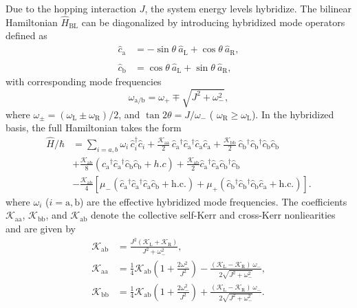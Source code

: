 \documentclass[%
reprint,
floatfix,
superscriptaddress,
amsmath,amssymb,
aps,
pra,
]{revtex4-2}
\newcommand*{\scrpt}[1]{\mathrm{#1}}
\newcommand*{\s}[1]{\ensuremath{_\scrpt{#1}}}
\begin{document}
Due to the hopping interaction $J$, the system energy levels hybridize. The bilinear Hamiltonian $\hat H_{\mathrm{BL}}$ can be diagonalized by introducing hybridized mode operators defined as
%
 \begin{align}  
     \label{AB}
     \hat c\s{a} & = - \sin \theta \: \hat a\s{L} + \cos \theta \: \hat a\s{R},\nonumber 
    \\
    \\
    \hat c\s{b} & = \cos \theta \: \hat a\s{L} + \sin \theta \: \hat a\s{R}, \nonumber  
\end{align}
%
with corresponding mode frequencies
%
\begin{equation}
    \label{eq_hybridized_frquencies}
    \omega\s{a/b}  = \omega_{+} \mp \sqrt{J^2 + \omega_-^2}, 
\end{equation}
%
\noindent
where $\omega_{\pm} = (\omega\mathrm{_L} \pm \omega\mathrm{_R}) /2$, and $\tan 2 \theta = J / \omega_-$ ( $\omega\mathrm{_R} \geq \omega\mathrm{_L} $). 
In the hybridized basis, the full Hamiltonian takes the form
%
\begin{align}
\label{HHyb}
    \hat H / \hbar  & = \sum_{i=a,b} \omega_i \, \hat c_i^{\dagger} \hat c_i +\frac{\mathcal{K}\s{aa}}{2} \, \hat c\s{a}^{\dagger} \hat c\s{a}^{\dagger} \hat c\s{a}  \hat c\s{a}  + \frac{\mathcal{K}\s{bb}}{2} \, \hat c\s{b}^{\dagger} \hat c\s{b}^{\dagger} \hat c\s{b} \hat c\s{b} \nonumber \\
    & + \frac{\mathcal{K}\s{ab}}{8} \left( \hat c\s{a}^{\dagger} \hat c\s{a}^{\dagger} \hat c\s{b} \hat c\s{b} + h.c \right) + \frac{\mathcal{K}\s{ab}}{2} \hat c\s{a}^{\dagger} \hat c\s{a} \hat c\s{b}^{\dagger} \hat c\s{b}   \\
   & - \frac{\mathcal{K}\s{ab}}{4} \left[ \mu_- \left( \hat c\s{a}^{\dagger} \hat c\s{a}^{\dagger} \hat c\s{a} \hat c\s{b} + \mathrm{h.c.} \right) + \mu_+ \left( \hat c\s{b}^{\dagger} \hat c\s{b}^{\dagger} \hat c\s{b}  \hat c\s{a}  + \mathrm{h.c.} \right) \right]. \nonumber
\end{align}
%
where $\omega_{i}$ ($i = \mathrm{a, b}$) are the effective hybridized mode frequencies. The coefficients $\mathcal{K}\s{aa}$, $\mathcal{K}\s{bb}$, and $\mathcal{K}\s{ab}$ denote the collective self-Kerr and cross-Kerr nonliearities and are given by
%
\begin{subequations}
\begin{align}
\label{Kerr}
    \mathcal{K}\s{ab} & = \frac{J^2 \left( \mathcal{K}\s{L} + \mathcal{K}\s{R} \right)}{J^2 + \omega_-^2}, \\
    \mathcal{K}\s{aa} & = \frac{1}{4} \mathcal{K}\s{ab} \left( 1 + \frac{2 \omega_-^2}{J^2} \right) - \frac{\left( \mathcal{K}\s{L} - \mathcal{K}\s{R} \right) \: \omega_-}{2 \sqrt{J^2 + \omega_-^2}}, \\
    \mathcal{K}\s{bb} & = \frac{1}{4} \mathcal{K}\s{ab} \left( 1 + \frac{2 \omega_-^2}{J^2} \right) + \frac{\left( \mathcal{K}\s{L} - \mathcal{K}\s{R} \right) \: \omega_-}{2 \sqrt{J^2 + \omega_-^2}}.
\end{align}
\end{subequations}
\end{document}
